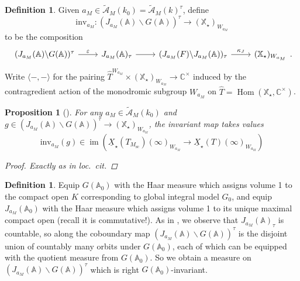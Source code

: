 \documentclass[openany]{amsbook}
\newtheorem{proposition}[theorem]{Proposition}
\theoremstyle{definition}
\newtheorem{definition}[theorem]{Definition}
\theoremstyle{remark}
\numberwithin{equation}{section}
\newcommand{\C}{\mathbb{C}}
\newcommand{\cA}{\mathcal{A}}
\newcommand{\A}{\mathbb{A}}
\newcommand{\im}{\operatorname{im}}
\newcommand{\ul}[1]{\underline{#1}}
\renewcommand{\epsilon}{\varepsilon}
\renewcommand{\-}{\operatorname{-}}
\newcommand{\Hom}{\operatorname{Hom}}
\renewcommand{\A}{\mathbb{A}}
\newcommand{\ctA}{\widetilde{\cA}}
\newcommand{\bX}{\mathbb{X}}
\newcommand{\inv}{\mathrm{inv}}
\renewcommand{\sc}{\mathrm{sc}}
\begin{document}
\begin{definition}
    Given $a_M \in \ctA_{M}(k_0) = \ctA_M(k)^\tau$, define
    $$
        \inv_{a_M} : (J_{a_M}(\A) \backslash G(\A))^{\tau} \to (\bX_\star)_{W_{a_M}}
    $$
    to be the composition
    $$
        \begin{tikzcd}[ampersand replacement=\&] (J_{a_M}(\A) \backslash G(\A))^{\tau} \ar[r, "{\epsilon}"] \& J_{a_M}(\A)_\tau \ar[r] \& (J_{a_M}(F)\backslash J_{a_M}(\A))_{\tau} \ar[r, "{\kappa_J}"] \& (\bX_\star)_{W_{a_M}}
        \end{tikzcd}.
    $$
    Write $\langle -, -\rangle$ for the pairing $\widehat{T}^{W_{a_M}} \times (\bX_\star)_{W_{a_M}} \to \C^\times$ induced by the contragredient action of the monodromic subgroup $W_{a_M}$ on $\widehat{T} = \Hom(\bX_\star, \C^\times)$.
\end{definition}

\begin{proposition}[{\cite[Lemme 11.4.2]{CLII}}]\label{prop.inv.sc.cover}
    For any $a_M \in \ctA_{M}(k_0)$ and $g \in (J_{a_M}(\A) \backslash G(\A))^{\tau} \to (\bX_\star)_{W_{a_M}}$, the invariant map takes values
    $$
    \inv_{a_M}(g) \in \im\left(\ul{X}_\star(T_{M_{\sc}})(\infty)_{W_{a_M}} \to  \ul{X}_\star(T)(\infty)_{W_{a_M}}\right)
    $$
    \begin{proof}
        Exactly as in \textit{loc.\ cit.}
    \end{proof}
\end{proposition}

\begin{definition}\label{def.Haar.measure.max.cmpt.convention} Equip $G(\A_0)$ with the Haar measure which assigns volume 1 to the compact open $K$ corresponding to global integral model $G_0$, and equip $J_{a_M}(\A_0)$ with the Haar measure which assigns volume 1 to its unique maximal compact open (recall it is commutative!). As in \cite[\S 11.5]{CLII}, we observe that $J_{a_M}(\A)_\tau$ is countable, so along the coboundary map $(J_{a_M}(\A) \backslash G(\A))^{\tau}$ is the disjoint union of countably many orbits under $G(\A_0)$, each of which can be equipped with the quotient measure from $G(\A_0)$. So we obtain a measure on $(J_{a_M}(\A) \backslash G(\A))^{\tau}$ which is right $G(\A_0)$-invariant. \end{definition}
\end{document}
